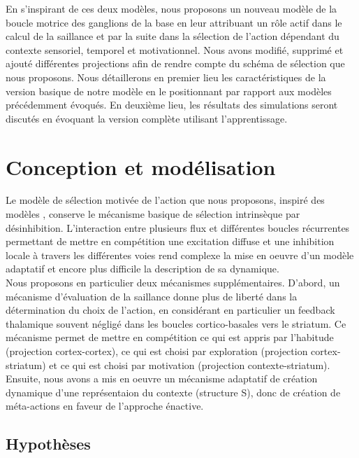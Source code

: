 En s'inspirant de ces deux modèles, nous proposons un nouveau modèle de la boucle motrice des ganglions de la base en leur attribuant un rôle actif dans le calcul de la saillance et par la suite dans la sélection de l'action dépendant du contexte sensoriel, temporel et motivationnel. Nous avons modifié, supprimé et ajouté différentes projections afin de rendre compte du schéma de sélection que nous proposons. Nous détaillerons en premier lieu les caractéristiques de la version basique de notre modèle en le positionnant par rapport aux modèles précédemment évoqués. En deuxième lieu, les résultats des simulations seront discutés en évoquant la version complète utilisant l'apprentissage.\\  

\section{Conception et modélisation}

Le modèle de sélection motivée de l'action que nous proposons, inspiré des modèles \cite{Gurney:2001a, Girard:2008}, conserve le mécanisme basique de sélection intrinsèque par désinhibition. L'interaction entre plusieurs flux et différentes boucles récurrentes permettant de mettre en compétition une excitation diffuse et une inhibition locale à travers les différentes voies rend complexe la mise en oeuvre d'un modèle adaptatif et encore plus difficile la description de sa dynamique.\\
 
Nous proposons en particulier deux mécanismes supplémentaires. D'abord, un mécanisme d'évaluation de la saillance donne plus de liberté dans la détermination du choix de l'action, en considérant en particulier un feedback thalamique souvent négligé dans les boucles cortico-basales vers le striatum. Ce mécanisme permet de mettre en compétition ce qui est appris par l'habitude (projection cortex-cortex), ce qui est choisi par exploration (projection cortex-striatum) et ce qui est choisi par motivation (projection contexte-striatum). Ensuite, nous avons a mis en oeuvre un mécanisme adaptatif de création dynamique d'une représentaion du contexte (structure S), donc de création de méta-actions en faveur de l'approche énactive.\\%

\subsection{Hypothèses}

